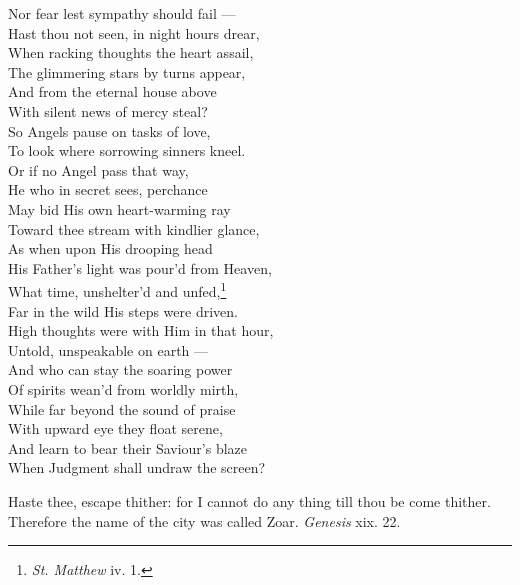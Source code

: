   Nor fear lest sympathy should fail — \\
 Hast thou not seen, in night hours drear, \\
 When racking thoughts the heart assail, \\
 The glimmering stars by turns appear, \\
 And from the eternal house above \\
 With silent news of mercy steal? \\
 So Angels pause on tasks of love, \\
 To look where sorrowing sinners kneel. \\
  Or if no Angel pass that way, \\
 He who in secret sees, perchance \\
 May bid His own heart-warming ray \\
 Toward thee stream with kindlier glance, \\
 As when upon His drooping head \\
 His Father’s light was pour’d from Heaven, \\
 What time, unshelter’d and unfed,\footnote{\emph{St. Matthew} iv. 1.} \\
 Far in the wild His steps were driven. \\
  High thoughts were with Him in that hour, \\
 Untold, unspeakable on earth — \\
 And who can stay the soaring power \\
 Of spirits wean’d from worldly mirth, \\
 While far beyond the sound of praise \\
 With upward eye they float serene, \\
 And learn to bear their Saviour’s blaze \\
 When Judgment shall undraw the screen?\\


Haste thee, escape thither: for I cannot do any thing till thou be come thither. Therefore the name of the city was called Zoar. \emph{Genesis} xix. 22.


